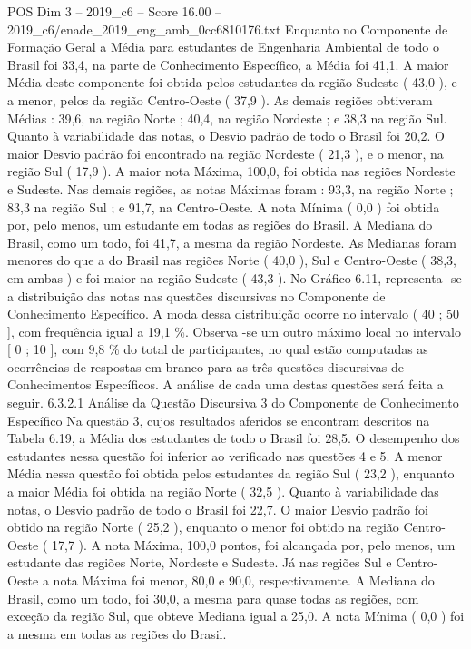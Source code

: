 \begin{textsample}{POS Dim 3 – 2019\_c6 – Score 16.00 – 2019\_c6/enade\_2019\_eng\_amb\_0cc6810176.txt}
Enquanto no Componente de Formação Geral a Média para estudantes de Engenharia Ambiental de todo o Brasil foi 33,4, na parte de Conhecimento Específico, a Média foi 41,1.
A maior Média deste componente foi obtida pelos estudantes da região Sudeste ( 43,0 ), e a menor, pelos da região Centro-Oeste ( 37,9 ).
As demais regiões obtiveram Médias : 39,6, na região Norte ; 40,4, na região Nordeste ; e 38,3 na região Sul.
Quanto à variabilidade das notas, o Desvio padrão de todo o Brasil foi 20,2.
O maior Desvio padrão foi encontrado na região Nordeste ( 21,3 ), e o menor, na região Sul ( 17,9 ).
A maior nota Máxima, 100,0, foi obtida nas regiões Nordeste e Sudeste.
Nas demais regiões, as notas Máximas foram : 93,3, na região Norte ; 83,3 na região Sul ; e 91,7, na Centro-Oeste.
A nota Mínima ( 0,0 ) foi obtida por, pelo menos, um estudante em todas as regiões do Brasil.
A Mediana do Brasil, como um todo, foi 41,7, a mesma da região Nordeste.
As Medianas foram menores do que a do Brasil nas regiões Norte ( 40,0 ), Sul e Centro-Oeste ( 38,3, em ambas ) e foi maior na região Sudeste ( 43,3 ).
No Gráfico 6.11, representa -se a distribuição das notas nas questões discursivas no Componente de Conhecimento Específico.
A moda dessa distribuição ocorre no intervalo ( 40 ; 50 ], com frequência igual a 19,1 \%.
Observa -se um outro máximo local no intervalo [ 0 ; 10 ], com 9,8 \% do total de participantes, no qual estão computadas as ocorrências de respostas em branco para as três questões discursivas de Conhecimentos Específicos.
A análise de cada uma destas questões será feita a seguir. 6.3.2.1 Análise da Questão Discursiva 3 do Componente de Conhecimento Específico Na questão 3, cujos resultados aferidos se encontram descritos na Tabela 6.19, a Média dos estudantes de todo o Brasil foi 28,5.
O desempenho dos estudantes nessa questão foi inferior ao verificado nas questões 4 e 5.
A menor Média nessa questão foi obtida pelos estudantes da região Sul ( 23,2 ), enquanto a maior Média foi obtida na região Norte ( 32,5 ).
Quanto à variabilidade das notas, o Desvio padrão de todo o Brasil foi 22,7.
O maior Desvio padrão foi obtido na região Norte ( 25,2 ), enquanto o menor foi obtido na região Centro-Oeste ( 17,7 ).
A nota Máxima, 100,0 pontos, foi alcançada por, pelo menos, um estudante das regiões Norte, Nordeste e Sudeste.
Já nas regiões Sul e Centro-Oeste a nota Máxima foi menor, 80,0 e 90,0, respectivamente.
A Mediana do Brasil, como um todo, foi 30,0, a mesma para quase todas as regiões, com exceção da região Sul, que obteve Mediana igual a 25,0.
A nota Mínima ( 0,0 ) foi a mesma em todas as regiões do Brasil.

\end{textsample}
